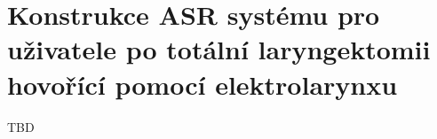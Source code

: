 \chapter{Konstrukce ASR systému pro uživatele po totální laryngektomii hovořící pomocí elektrolarynxu}
\label{chap:construction}

TBD






